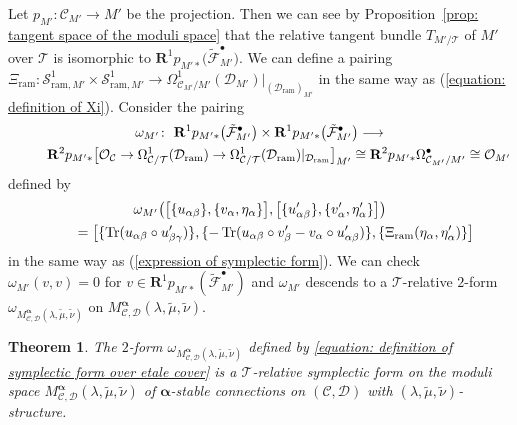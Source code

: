 \documentclass[pdftex]{sigma}
\numberwithin{equation}{section}
\newtheorem{Theorem}{Theorem}[section]
\newcommand{\Tr}{\mathop{\rm Tr}\nolimits}
\newcommand{\balpha}{\boldsymbol \alpha}
\begin{document}
Let $p_{M'}\colon {\mathcal C}_{M'}\longrightarrow M'$ be the projection.
Then we can see by Proposition~\ref{prop: tangent space of the moduli space}
that the relative tangent bundle
$T_{M'/{\mathcal T}}$ of $M'$ over ${\mathcal T}$ is isomorphic to
$\mathbf{R}^1p_{M' *}\big(\tilde{\mathcal F}^{\bullet}_{M'}\big)$.
We can define a pairing
$\Xi_{\mathrm{ram}}\colon
{\mathcal S}^1_{\mathrm{ram},M'}\times {\mathcal S}^1_{\mathrm{ram},M'}
\longrightarrow
\Omega^1_{{\mathcal C}_{M'}/M'}({\mathcal D}_{M'})|_{({\mathcal D}_{\mathrm{ram}})_{M'}}$
in the same way as
(\ref{equation: definition of Xi}).
Consider the pairing
\begin{gather}
 \omega_{M'} \colon \
 \mathbf{R}^1 p_{M' *}\big(\tilde{\mathcal F}^{\bullet}_{M'}\big) \times
 \mathbf{R}^1p_{M' *}\big(\tilde{\mathcal F}^{\bullet}_{M'}\big)\longrightarrow \nonumber\\
 \hphantom{\omega_{M'} \colon} \
 \mathbf{R}^2 p_{M' *}\big[ {\mathcal O}_{\mathcal C}\to
 \Omega^1_{{\mathcal C}/{\mathcal T}} ({\mathcal D}_{\mathrm{ram}})
 \to \Omega^1_{{\mathcal C}/{\mathcal T}}({\mathcal D}_{\mathrm{ram}})|
 _{ {\mathcal D}_{\mathrm{ram}} } \big]_{M'}  \cong
 \mathbf{R}^2 p_{M' *} \Omega^{\bullet}_{{\mathcal C}_{M'}/M'}
 \cong {\mathcal O}_{M'}\label{equation: definition of symplectic form over etale cover}
\end{gather}
defined by
\begin{gather*}
 \omega_{M'}\big( \big[ \{ u_{\alpha\beta}\},
 \{ v_{\alpha}, \eta_{\alpha} \} \big] ,
 \big[ \{ u'_{\alpha\beta}\},
 \{ v'_{\alpha}, \eta'_{\alpha} \} \big]
\big) \\
 \qquad{}=
\big[
 \{ \Tr(u_{\alpha\beta}\circ u'_{\beta\gamma})\},
 \{ {-}\Tr(u_{\alpha\beta}\circ v'_{\beta}-v_{\alpha}\circ u'_{\alpha\beta})\},
 \{\Xi_{\mathrm{ram}}( \eta_{\alpha} , \eta'_{\alpha} )
 \}
\big]
\end{gather*}
in the same way as (\ref{expression of symplectic form}).
We can check $\omega_{M'}(v,v)=0$ for
$v\in \mathbf{R}^1p_{M' *}(\tilde{\mathcal F}^{\bullet}_{M'})$
and $\omega_{M'}$ descends to a ${\mathcal T}$-relative $2$-form
$\omega_{M^{\balpha}_{{\mathcal C},{\mathcal D}}(\lambda,\tilde{\mu},\tilde{\nu})}$ on
$M^{\balpha}_{{\mathcal C},{\mathcal D}}(\lambda,\tilde{\mu},\tilde{\nu})$.

\begin{Theorem}
\label{theorem: existence of symplectic form and d-closedness}
The $2$-form
$\omega_{M^{\balpha}_{{\mathcal C},{\mathcal D}}(\lambda,\tilde{\mu},\tilde{\nu})}$
defined by
\eqref{equation: definition of symplectic form over etale cover}
is a ${\mathcal T}$-relative symplectic form
on the moduli space
$M^{\balpha}_{{\mathcal C},{\mathcal D}}(\lambda,\tilde{\mu},\tilde{\nu})$
of $\balpha$-stable connections
on $({\mathcal C},{\mathcal D})$ with $(\lambda,\tilde{\mu},\tilde{\nu})$-structure.
\end{Theorem}
\end{document}
